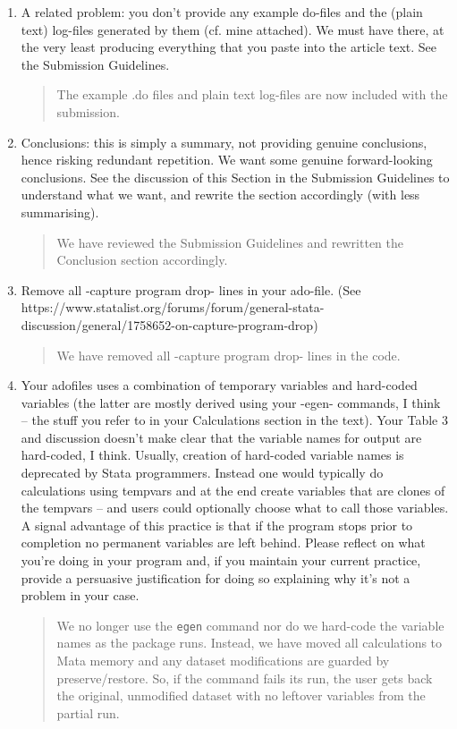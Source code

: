 \documentclass{article}[11pt]
\begin{document}
\begin{enumerate}
    \item A related problem: you don’t provide any example do-files and the (plain text) log-files generated by them (cf. mine attached). We must have there, at the very least producing everything that you paste into the article text. See the Submission Guidelines. 
    \begin{quote}
        The example .do files and plain text log-files are now included with the submission.
    \end{quote}

    \item Conclusions: this is simply a summary, not providing genuine conclusions, hence risking redundant repetition. We want some genuine forward-looking conclusions. See the discussion of this Section in the Submission Guidelines to understand what we want, and rewrite the section accordingly (with less summarising).
    \begin{quote}
        We have reviewed the Submission Guidelines and rewritten the Conclusion section accordingly.
    \end{quote}

    \item Remove all -capture program drop- lines in your ado-file. (See https://www.statalist.org/forums/forum/general-stata-discussion/general/1758652-on-capture-program-drop)
    \begin{quote}
        We have removed all -capture program drop- lines in the code.
    \end{quote}

    \item Your adofiles uses a combination of temporary variables and hard-coded variables (the latter are mostly derived using your -egen- commands, I think – the stuff you refer to in your Calculations section in the text). Your Table 3 and discussion doesn’t make clear that the variable names for output are hard-coded, I think. Usually, creation of hard-coded variable names is deprecated by Stata programmers. Instead one would typically do calculations using tempvars and at the end create variables that are clones of the tempvars – and users could optionally choose what to call those variables. A signal advantage of this practice is that if the program stops prior to completion no permanent variables are left behind. Please reflect on what you’re doing in your program and, if you maintain your current practice, provide a persuasive justification for doing so explaining why it’s not a problem in your case.
    \begin{quote}
        We no longer use the \texttt{egen} command nor do we hard-code the variable names as the package runs. Instead, we have moved all calculations to Mata memory and any dataset modifications are guarded by preserve/restore. So, if the command fails its run, the user gets back the original, unmodified dataset with no leftover variables from the partial run. \\


\end{quote}
\end{enumerate}
\end{document}
